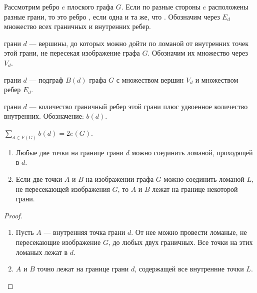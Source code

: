 \begin{definition}
    Рассмотрим ребро $e$ плоского графа $G$. Если по разные стороны $e$ расположены разные грани, то это ребро , если одна и та же, что .
	Обозначим через $E_d$ множество всех граничных и внутренних ребер.
\end{definition}
\begin{definition}
     грани $d$ --- вершины, до которых можно дойти по ломаной от внутренних точек этой грани, не пересекая изображение графа $G$. Обозначим их множество через $V_d$.
\end{definition}
\begin{definition}
     грани $d$ --- подграф $B(d)$ графа $G$ с множеством вершин $V_d$ и множеством ребер $E_d$.
\end{definition}
\begin{definition}
     грани $d$ --- количество граничный ребер этой грани плюс удвоенное количество внутренних. Обозначение: $b(d)$.

	$\sum_{d \in F(G)}^{} b(d) = 2 e(G)$.
\end{definition}
\begin{lemma}\label{lm:planar_1}
    \begin{enumerate}
		\item Любые две точки на границе грани $d$ можно соединить ломаной, проходящей в $d$.
		\item Если две точки $A$ и $B$ на изображении графа $G$ можно соединить ломаной $L$, не пересекающей изображения $G$, то $A$ и $B$ лежат на границе некоторой грани.
    \end{enumerate}
\end{lemma}
\begin{proof}
    \begin{enumerate}
		\item Пусть $A$ --- внутренняя точка грани $d$. От нее можно провести ломаные, не пересекающие изображение $G$, до любых двух граничных. Все точки на этих ломаных лежат в $d$.
		\item $A$ и $B$ точно лежат на границе грани $d$, содержащей все внутренние точки $L$.
    \end{enumerate}
\end{proof}
